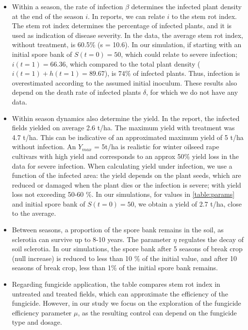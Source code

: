 \documentclass{article}
\begin{document}
\begin{itemize}
\item Within a season, the rate of infection $\beta$ determines the infected plant density at the end of the season $i$. In reports, we can relate $i$ to the stem rot index. The stem rot index determines the percentage of infected plants, and it is used as indication of disease severity. In the data, the average stem rot index, without treatment, is 60.5\% (s = 10.6). In our simulation, if starting with an initial spore bank of $S(t = 0) = 50$, which could relate to severe infection; $i(t = 1) = 66.36$, which compared to the total plant density ($i(t=1) + h(t = 1) = 89.67$), is $74\%$ of infected plants. Thus, infection is overestimated according to the assumed initial inoculum. These results also depend on the death rate of infected plants $\delta$, for which we do not have any data. 

\item Within season dynamics also determine the yield. In the report, the infected fields yielded on average 2.6 t/ha. The maximum yield with treatment was 4.7 t/ha. This can be indicative of an approximated maximum yield of 5 t/ha without infection. An $Y_{max}$ = 5t/ha is realistic for winter oilseed rape cultivars with high yield \cite{} and corresponds to an approx 50\% yield loss in the data for severe infection. When calculating yield under infection, we use a function of the infected area: the yield depends on the plant seeds, which are reduced or damaged when the plant dies or the infection is severe; with yield loss not exceeding 50-60 \%. In our simulations, for values in \ref{table:params} and initial spore bank of $S(t = 0) = 50$, we obtain a yield of 2.7 t/ha, close to the average.

\item Between seasons, a proportion of the spore bank remains in the soil, as sclerotia can survive up to 8-10 years. The parameter $\eta$ regulates the decay of soil sclerotia. In our simulations, the spore bank after 5 seasons of break crop (null increase) is reduced to less than 10 \% of the initial value, and after 10 seasons of break crop, less than 1\% of the initial spore bank remains.   


\item Regarding fungicide application, the table compares stem rot index in untreated and treated fields, which can approximate the efficiency of the fungicide. However, in our study we focus on the exploration of the fungicide efficiency parameter $\mu$, as the resulting control can depend on the fungicide type and dosage.
\end{itemize}
\end{document}
